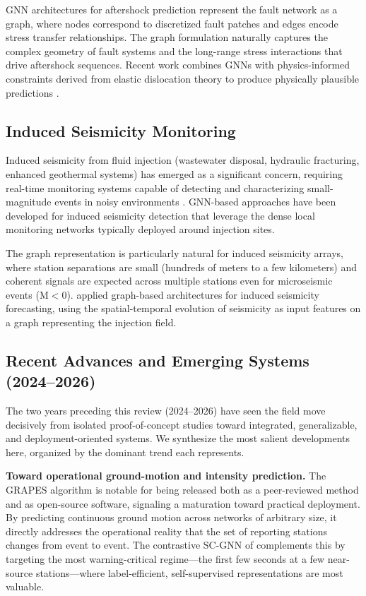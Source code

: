 \documentclass[review,authoryear]{elsarticle}
\begin{document}
GNN architectures for aftershock prediction represent the fault network as a graph, where nodes correspond to discretized fault patches and edges encode stress transfer relationships. The graph formulation naturally captures the complex geometry of fault systems and the long-range stress interactions that drive aftershock sequences. Recent work combines GNNs with physics-informed constraints derived from elastic dislocation theory to produce physically plausible predictions \citep{wang2021injection}.

\subsection{Induced Seismicity Monitoring}

Induced seismicity from fluid injection (wastewater disposal, hydraulic fracturing, enhanced geothermal systems) has emerged as a significant concern, requiring real-time monitoring systems capable of detecting and characterizing small-magnitude events in noisy environments \citep{ellsworth2013injection}. GNN-based approaches have been developed for induced seismicity detection that leverage the dense local monitoring networks typically deployed around injection sites.

The graph representation is particularly natural for induced seismicity arrays, where station separations are small (hundreds of meters to a few kilometers) and coherent signals are expected across multiple stations even for microseismic events (M$<$0). \citet{wang2021injection} applied graph-based architectures for induced seismicity forecasting, using the spatial-temporal evolution of seismicity as input features on a graph representing the injection field.

\subsection{Recent Advances and Emerging Systems (2024--2026)}
\label{sec:recent_advances}

The two years preceding this review (2024--2026) have seen the field move decisively from isolated proof-of-concept studies toward integrated, generalizable, and deployment-oriented systems. We synthesize the most salient developments here, organized by the dominant trend each represents.

\textbf{Toward operational ground-motion and intensity prediction.} The GRAPES algorithm \citep{clements2024grapes} is notable for being released both as a peer-reviewed method and as open-source software, signaling a maturation toward practical deployment. By predicting continuous ground motion across networks of arbitrary size, it directly addresses the operational reality that the set of reporting stations changes from event to event. The contrastive SC-GNN of \citet{murshed2024scgnn} complements this by targeting the most warning-critical regime---the first few seconds at a few near-source stations---where label-efficient, self-supervised representations are most valuable.
\end{document}
